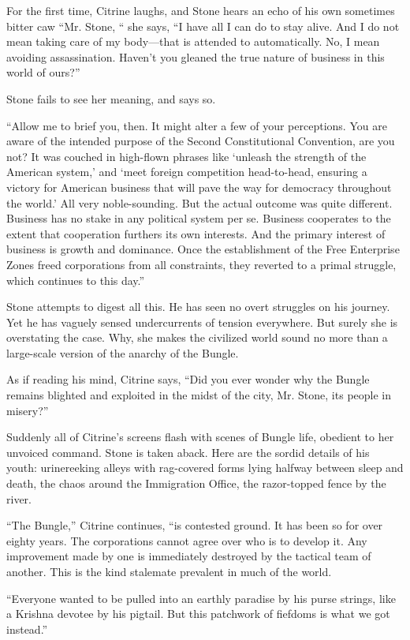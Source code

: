 For the first time, Citrine laughs, and Stone hears an echo of his own sometimes bitter caw ``Mr. Stone, `` she says, ``I have all I can do to stay alive. And I do not mean taking care of my body---that is attended to automatically. No, I mean avoiding assassination. Haven't you gleaned the true nature of business in this world of ours?''

Stone fails to see her meaning, and says so.

``Allow me to brief you, then. It might alter a few of your perceptions. You are aware of the intended purpose of the Second Constitutional Convention, are you not? It was couched in high-flown phrases like ‘unleash the strength of the American system,' and ‘meet foreign competition head-to-head, ensuring a victory for American business that will pave the way for democracy throughout the world.' All very noble-sounding. But the actual outcome was quite different. Business has no stake in any political system per se. Business cooperates to the extent that cooperation furthers its own interests. And the primary interest of business is growth and dominance. Once the establishment of the Free Enterprise Zones freed corporations from all constraints, they reverted to a primal struggle, which continues to this day.''

Stone attempts to digest all this. He has seen no overt struggles on his journey. Yet he has vaguely sensed undercurrents of tension everywhere. But surely she is overstating the case. Why, she makes the civilized world sound no more than a large-scale version of the anarchy of the Bungle.

As if reading his mind, Citrine says, ``Did you ever wonder why the Bungle remains blighted and exploited in the midst of the city, Mr. Stone, its people in misery?''

Suddenly all of Citrine's screens flash with scenes of Bungle life, obedient to her unvoiced command. Stone is taken aback. Here are the sordid details of his youth: urinereeking alleys with rag-covered forms lying halfway between sleep and death, the chaos around the Immigration Office, the razor-topped fence by the river.

``The Bungle,'' Citrine continues, ``is contested ground. It has been so for over eighty years. The corporations cannot agree over who is to develop it. Any improvement made by one is immediately destroyed by the tactical team of another. This is the kind stalemate prevalent in much of the world.

``Everyone wanted to be pulled into an earthly paradise by his purse strings, like a Krishna devotee by his pigtail. But this patchwork of fiefdoms is what we got instead.''

